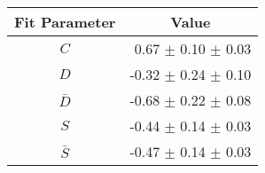 \begin{tabular}{c r } 
\hline
\hline
Fit Parameter & \multicolumn{1}{c}{Value}  \\ 
\hline
$C$ & 0.67 $\pm$ 0.10 $\pm$ 0.03 \\ 
$D$ & -0.32 $\pm$ 0.24 $\pm$ 0.10 \\ 
$\bar{D}$ & -0.68 $\pm$ 0.22 $\pm$ 0.08 \\ 
$S$ & -0.44 $\pm$ 0.14 $\pm$ 0.03 \\ 
$\bar{S}$ & -0.47 $\pm$ 0.14 $\pm$ 0.03 \\ 
\hline
\hline
\end{tabular}
